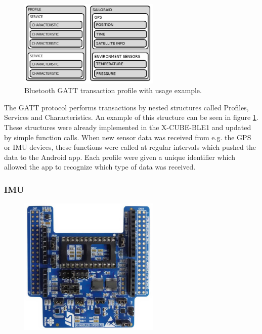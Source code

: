 \begin{figure}[H]
\centering
\includegraphics[width=0.6\textwidth]{Figures/bt_gatt_profile.png}
\caption{Bluetooth GATT transaction profile with usage example.}
\label{bt-gatt-profile}
\end{figure}

The GATT protocol performs transactions by nested structures called Profiles, Services and Characteristics. An example of this structure can be seen in figure \ref{bt-gatt-profile}. These structures were already implemented in the X-CUBE-BLE1 and updated by simple function calls. When new sensor data was received from e.g. the GPS or IMU devices, these functions were called at regular intervals which pushed the data to the Android app. Each profile were given a unique identifier which allowed the app to recognize which type of data was received.

\subsubsection{IMU}

\begin{figure}[H]
\centering
\includegraphics[width=0.6\textwidth]{Figures/x-nucleo-iks01a2.jpg}
\caption{}
\label{imu-eval-board}
\end{figure}

